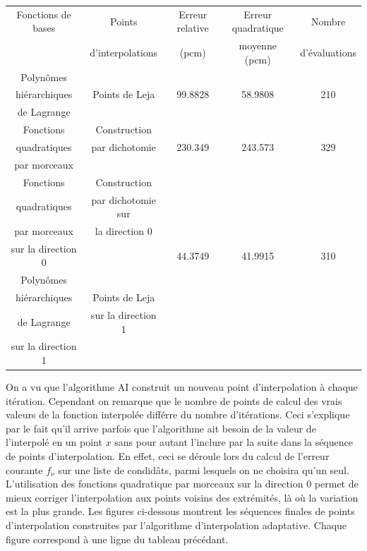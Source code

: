\begin{center}
\begin{table}
\begin{tabular}{|*{5}{c|}}
	\hline
	Fonctions de bases 		& Points 			 									& Erreur relative	& Erreur quadratique 	& Nombre 		\\
												&	d'interpolations							&	 (pcm)					& moyenne (pcm)			 	& d'évaluations			\\
	\hline
	Polynômes  						&&&&\\
	hiérarchiques					& Points de Leja 		 						& 99.8828					& 58.9808 						& 210									\\
	de Lagrange						&&&&\\
	\hline
	Fonctions 						&	Construction			 						&&&\\
	quadratiques 					&	par dichotomie								&	230.349 				& 243.573							& 329 								\\
	par morceaux  				&   					   								&&&\\
	\hline
	Fonctions     				& Construction									&&&\\
	quadratiques					& par dichotomie sur 						&&&\\
	par morceaux					& la direction 0								&&&\\
	sur la direction 0		&																&	44.3749 				& 41.9915							& 310 								\\
	Polynômes     				&  															&&&\\
	hiérarchiques					& Points de Leja								&&&\\
	de Lagrange						& sur la direction 1						&&&\\
	sur la direction 1		&																&&&\\
	\hline
\end{tabular}
\label{table:analytics}
\end{table}
\end{center}
On a vu que l'algorithme AI construit un nouveau point d'interpolation à chaque itération. Cependant on remarque que le nombre de points de calcul des vrais valeurs de la fonction interpolée différre du nombre d'itérations.
Ceci s'explique par le fait qu'il arrive parfois que l'algorithme ait besoin de la valeur de l'interpolé en un point $x$ sans pour autant l'inclure par la suite dans la séquence de points d'interpolation.
En effet, ceci se déroule lors du calcul de l'erreur courante $f_{\nu}$ sur une liste de condidâts, parmi lesquels on ne choisira qu'un seul. \\
L'utilisation des fonctions quadratique par morceaux sur la direction 0 permet de mieux corriger l'interpolation aux points voisins des extrémités, là où la variation est la plus grande.
Les figures ci-dessous montrent les séquences finales de points d'interpolation construites par l'algorithme d'interpolation adaptative.
Chaque figure correspond à une ligne du tableau précédant.

